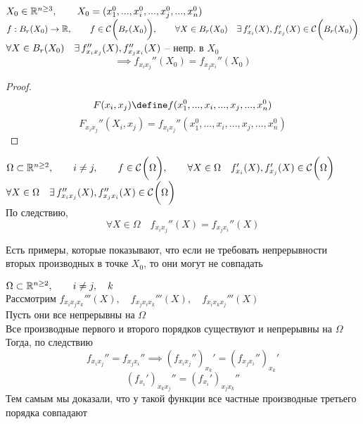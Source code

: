 \begin{implication}[для $ n > 2 $]
	$ X_0 \in \mathbb{R}^{n \ge 3}, \qquad X_0 = (x_1^0, ..., x_i^0, ..., x_j^0, ..., x_n^0) $ \\
	$ f : B_r(X_0) \to \mathbb{R}, \qquad f \in \mathcal{C}^{} \bigg( {B_r(X_0)} \bigg) , \qquad \forall X \in B_r(X_0) \quad \exists\, f_{x_i}'(X), f_{x_j}'(X) \in \mathcal{C}^{} \bigg( {B_r(X_0)} \bigg)  $ \\
	$ \forall X \in B_r(X_0) \quad \exists\, f_{x_ix_j}''(X), f_{x_jx_i}''(X) $ -- непр. в $ X_0 $
	$$ \implies f_{x_ix_j}''(X_0) = f_{x_jx_i}''(X_0) $$
\end{implication}

\begin{proof}
	$$ F(x_i, x_j) \define f(x_1^0, ..., x_i, ..., x_j, ..., x_n^0) $$
	$$ F_{x_ix_j}''(X_i, x_j) = f_{x_ix_j}''(x_1^0, ..., x_i, ..., x_j, ..., x_n^0) $$
\end{proof}

\begin{statement}
	$ \Omega \subset \mathbb{R}^{n \ge 2}, \qquad i \ne j, \qquad f \in \mathcal{C}^{} \bigg( {\Omega} \bigg) , \qquad \forall X \in \Omega \quad f_{x_i}'(X), f_{x_j}'(X) \in \mathcal{C}^{} \bigg( {\Omega} \bigg)  $ \\
	$ \forall X \in \Omega \quad \exists\, f_{x_ix_j}''(X), f_{x_jx_i}''(X) \in \mathcal{C}^{} \bigg( {\Omega} \bigg)  $ \\
	По следствию,
	$$ \forall X \in \Omega \quad f_{x_ix_j}''(X) = f_{x_jx_i}''(X) $$
\end{statement}

\begin{remark}
	Есть примеры, которые показывают, что если не требовать непрерывности вторых производных в точке $ X_0 $, то они могут не совпадать
\end{remark}

\begin{statement}
	$ \Omega \subset \mathbb{R}^{n \ge 2}, \qquad i \ne j, \quad k $ \\
	Рассмотрим $ f_{x_ix_jx_k}'''(X), \quad f_{x_jx_ix_k}'''(X), \quad f_{x_ix_kx_j}'''(X) $ \\
	Пусть они все непрерывны на $ \Omega $ \\
	Все производные первого и второго порядков существуют и непрерывны на $ \Omega $ \\
	Тогда, по следствию
	$$ f_{x_ix_j}'' = f_{x_jx_i}'' \implies (f_{x_ix_j}'')_{x_k}' = (f_{x_jx_i}'')_{x_k}' $$
	$$ (f_{x_i}')_{x_kx_j}'' = (f_{x_i}')_{x_jx_k}'' $$
	Тем самым мы доказали, что у такой функции все частные производные третьего порядка совпадают
\end{statement}
